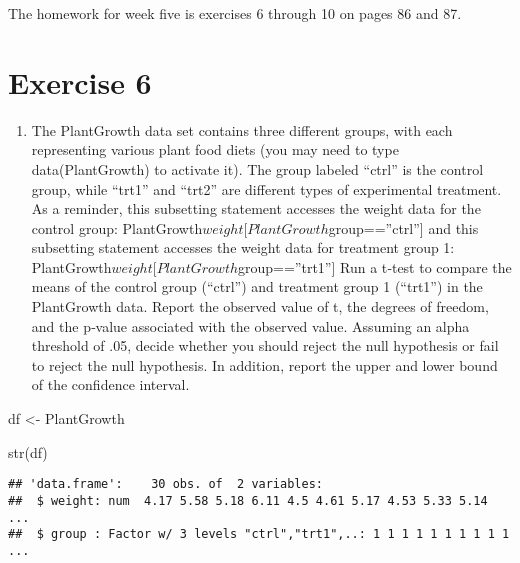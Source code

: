 \documentclass[
]{article}
\author{}
\date{\vspace{-2.5em}}
\newenvironment{Shaded}{\begin{snugshade}}{\end{snugshade}}
\newcommand{\FunctionTok}[1]{\textcolor[rgb]{0.00,0.00,0.00}{#1}}
\newcommand{\NormalTok}[1]{#1}
\newcommand{\OtherTok}[1]{\textcolor[rgb]{0.56,0.35,0.01}{#1}}
\providecommand{\tightlist}{%
  \setlength{\itemsep}{0pt}\setlength{\parskip}{0pt}}
\begin{document}
The homework for week five is exercises 6 through 10 on pages 86 and 87.

\hypertarget{exercise-6}{%
\section{Exercise 6}\label{exercise-6}}

\begin{enumerate}
\def\labelenumi{\arabic{enumi}.}
\setcounter{enumi}{5}
\tightlist
\item
  The PlantGrowth data set contains three different groups, with each
  representing various plant food diets (you may need to type
  data(PlantGrowth) to activate it). The group labeled ``ctrl'' is the
  control group, while ``trt1'' and ``trt2'' are different types of
  experimental treatment. As a reminder, this subsetting statement
  accesses the weight data for the control group:
  PlantGrowth\(weight[PlantGrowth\)group==''ctrl''{]} and this
  subsetting statement accesses the weight data for treatment group 1:
  PlantGrowth\(weight[PlantGrowth\)group==''trt1''{]} Run a t‐test to
  compare the means of the control group (``ctrl'') and treatment group
  1 (``trt1'') in the PlantGrowth data. Report the observed value of t,
  the degrees of freedom, and the p‐value associated with the observed
  value. Assuming an alpha threshold of .05, decide whether you should
  reject the null hypothesis or fail to reject the null hypothesis. In
  addition, report the upper and lower bound of the confidence interval.
\end{enumerate}

\begin{Shaded}
\begin{Highlighting}[]
\NormalTok{df }\OtherTok{\textless{}{-}}\NormalTok{ PlantGrowth}
\end{Highlighting}
\end{Shaded}

\begin{Shaded}
\begin{Highlighting}[]
\FunctionTok{str}\NormalTok{(df)}
\end{Highlighting}
\end{Shaded}

\begin{verbatim}
## 'data.frame':    30 obs. of  2 variables:
##  $ weight: num  4.17 5.58 5.18 6.11 4.5 4.61 5.17 4.53 5.33 5.14 ...
##  $ group : Factor w/ 3 levels "ctrl","trt1",..: 1 1 1 1 1 1 1 1 1 1 ...
\end{verbatim}
\end{document}
